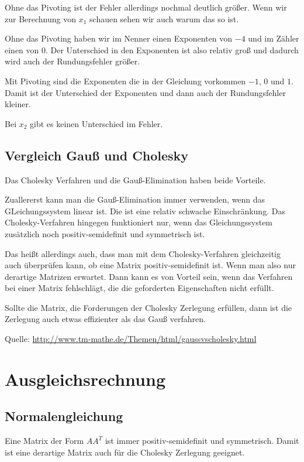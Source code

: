 \documentclass{article}
\begin{document}
Ohne das Pivoting ist der Fehler allerdings nochmal deutlich größer.
Wenn wir zur Berechnung von \(x_1\) schauen sehen wir auch warum das so ist.

Ohne das Pivoting haben wir im Nenner einen Exponenten von \(-4\) und im Zähler einen von \(0\).
Der Unterschied in den Exponenten ist also relativ groß und dadurch wird auch der Rundungsfehler größer.

Mit Pivoting sind die Exponenten die in der Gleichung vorkommen \(-1\), \(0\) und \(1\). 
Damit ist der Unterschied der Exponenten und dann auch der Rundungsfehler kleiner.

Bei \(x_2\) gibt es keinen Unterschied im Fehler.

\subsection{Vergleich Gauß und Cholesky}

Das Cholesky Verfahren und die Gauß-Elimination haben beide Vorteile.

Zuallererst kann man die Gauß-Elimination immer verwenden, wenn das GLeichungssystem linear ist.
Die ist eine relativ schwache Einschränkung.
Das Cholesky-Verfahren hingegen funktioniert nur, wenn das Gleichungssystem zusätzlich noch positiv-semidefinit und symmetrisch ist.

Das heißt allerdings auch, dass man mit dem Cholesky-Verfahren gleichzeitig auch überprüfen kann, ob eine Matrix positiv-semidefinit ist. Wenn man also nur derartige Matrizen erwartet. Dann kann es von Vorteil sein, wenn das Verfahren bei einer Matrix fehlschlägt, die die geforderten Eigenschaften nicht erfüllt.

Sollte die Matrix, die Forderungen der Cholesky Zerlegung erfüllen, dann ist die Zerlegung auch etwas effizienter als das Gauß verfahren.

Quelle: \url{http://www.tm-mathe.de/Themen/html/gaussvscholesky.html}


\section{Ausgleichsrechnung}

\subsection{Normalengleichung}

Eine Matrix der Form \(AA^T\) ist immer positiv-semidefinit und symmetrisch. Damit ist eine derartige Matrix auch für die Cholesky Zerlegung geeignet.
\end{document}
